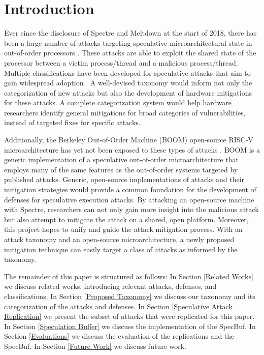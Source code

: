 \section{Introduction}

Ever since the disclosure of Spectre and Meltdown at the start of 2018, there has
been a large number of attacks targeting speculative microarchitectural state in
out-of-order processors \cite{b1,b2}. These attacks are able to exploit the shared
state of the processor between a victim process/thread and a malicious process/thread.
Multiple classifications have been developed for speculative attacks 
that aim to gain widespread adoption \cite{b5,b6,b7,b9,b10}.
A well-devised taxonomy would inform not only the 
categorization of new attacks but also the development of hardware mitigations for 
these attacks. A complete categorization system would help hardware researchers 
identify general mitigations for broad categories of vulnerabilities, instead of 
targeted fixes for specific attacks.

Additionally, the Berkeley Out-of-Order Machine (BOOM) open-source RISC-V
microarchitecture has yet not been exposed to these types of attacks \cite{b11}. BOOM
is a generic implementation of a speculative 
out-of-order microarchitecture that employs many of the same features as the 
out-of-order systems targeted by published attacks. Generic, open-source 
implementations of attacks and their mitigation strategies would provide a common 
foundation for the development of defenses for speculative execution attacks.
By attacking an open-source machine with Spectre, researchers can not only gain more 
insight into the malicious attack but also attempt to mitigate the attack on a shared,
open platform. Moreover, this project hopes to unify and guide the attack 
mitigation process. With an attack taxonomy and an open-source microarchitecture, a 
newly proposed mitigation technique can easily target a class of attacks as informed 
by the taxonomy.

The remainder of this paper is structured as follows: In Section \ref{Related Works} we discuss
related works, introducing relevant attacks, defenses, and classifications.
In Section \ref{Proposed Taxonomy} we discuss our taxonomy and its categorization of the attacks and defenses. In
Section \ref{Speculative Attack Replication} we present the subset of attacks that were replicated for this paper. In Section \ref{Speculation Buffer}
we discuss the implementation of the SpecBuf. In Section \ref{Evaluations} we discuss the evaluation of the
replications and the SpecBuf. In Section \ref{Future Work} we discuss future work.
